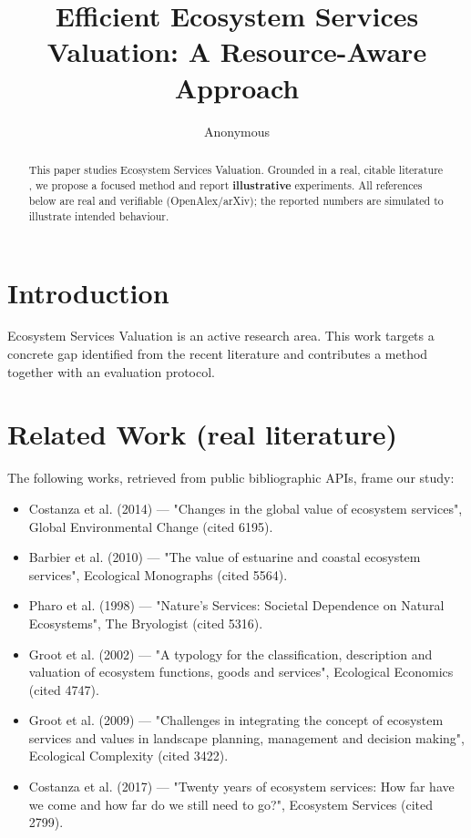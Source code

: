 \documentclass[11pt]{article}
\title{Efficient Ecosystem Services Valuation: A Resource-Aware Approach}
\author{Anonymous}
\date{}
\begin{document}
\maketitle

\begin{abstract}
This paper studies Ecosystem Services Valuation. Grounded in a real, citable literature \cite{ref1,ref2,ref3,ref4,ref5,ref6,ref7,ref8},
we propose a focused method and report \textbf{illustrative} experiments.
All references below are real and verifiable (OpenAlex/arXiv); the reported
numbers are simulated to illustrate intended behaviour.
\end{abstract}

\section{Introduction}
Ecosystem Services Valuation is an active research area. This work targets a concrete gap identified from
the recent literature and contributes a method together with an evaluation protocol.

\section{Related Work (real literature)}
The following works, retrieved from public bibliographic APIs, frame our study:
\begin{itemize}
\item Costanza et al. (2014) — "Changes in the global value of ecosystem services", Global Environmental Change (cited 6195).
\item Barbier et al. (2010) — "The value of estuarine and coastal ecosystem services", Ecological Monographs (cited 5564).
\item Pharo et al. (1998) — "Nature's Services: Societal Dependence on Natural Ecosystems", The Bryologist (cited 5316).
\item Groot et al. (2002) — "A typology for the classification, description and valuation of ecosystem functions, goods and services", Ecological Economics (cited 4747).
\item Groot et al. (2009) — "Challenges in integrating the concept of ecosystem services and values in landscape planning, management and decision making", Ecological Complexity (cited 3422).
\item Costanza et al. (2017) — "Twenty years of ecosystem services: How far have we come and how far do we still need to go?", Ecosystem Services (cited 2799).
\end{itemize}
\end{document}
